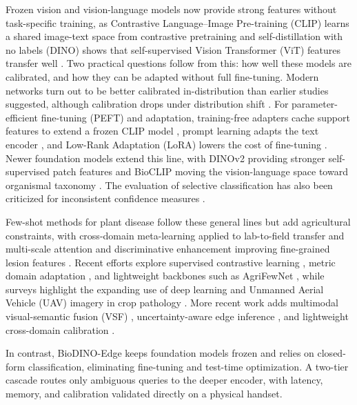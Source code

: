 \documentclass[preprint,12pt]{elsarticle}
\begin{document}
Frozen vision and vision-language models now provide strong features without task-specific training, as Contrastive Language--Image Pre-training (CLIP) learns a shared image-text space from contrastive pretraining \cite{radford2021clip} and self-distillation with no labels (DINO) shows that self-supervised Vision Transformer (ViT) features transfer well \cite{caron2021emerging}. Two practical questions follow from this: how well these models are calibrated, and how they can be adapted without full fine-tuning. Modern networks turn out to be better calibrated in-distribution than earlier studies suggested, although calibration drops under distribution shift \cite{minderer2021revisiting}. For parameter-efficient fine-tuning (PEFT) and adaptation, training-free adapters cache support features to extend a frozen CLIP model \cite{zhang2022tip}, prompt learning adapts the text encoder \cite{zhou2022coop}, and Low-Rank Adaptation (LoRA) lowers the cost of fine-tuning \cite{hu2022lora}. Newer foundation models extend this line, with DINOv2 providing stronger self-supervised patch features \cite{oquab2023dinov2} and BioCLIP moving the vision-language space toward organismal taxonomy \cite{stevens2024bioclip}. The evaluation of selective classification has also been criticized for inconsistent confidence measures \cite{traub2024overcoming}.

Few-shot methods for plant disease follow these general lines but add agricultural constraints, with cross-domain meta-learning applied to lab-to-field transfer \cite{yang2024laboratory} and multi-scale attention and discriminative enhancement improving fine-grained lesion features \cite{zhao2024mafde}. Recent efforts explore supervised contrastive learning \cite{mu2024few}, metric domain adaptation \cite{kudo2025few}, and lightweight backbones such as AgriFewNet \cite{babu2025agrifewnet}, while surveys highlight the expanding use of deep learning and Unmanned Aerial Vehicle (UAV) imagery in crop pathology \cite{radocaj2025evolution}. More recent work adds multimodal visual-semantic fusion (VSF) \cite{zhou2026vsf}, uncertainty-aware edge inference \cite{sharif2026real}, and lightweight cross-domain calibration \cite{zhao2026lightweight}.

In contrast, BioDINO-Edge keeps foundation models frozen and relies on closed-form classification, eliminating fine-tuning and test-time optimization. A two-tier cascade routes only ambiguous queries to the deeper encoder, with latency, memory, and calibration validated directly on a physical handset.
\end{document}
